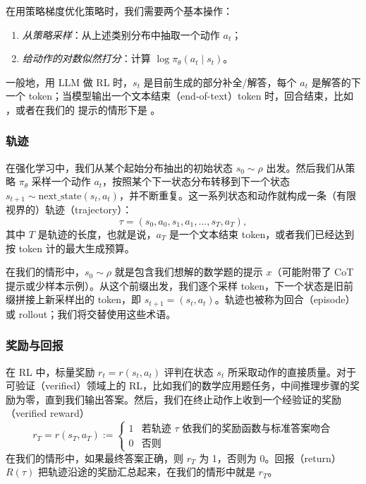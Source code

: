 在用策略梯度优化策略时，我们需要两个基本操作：

\begin{enumerate}
  \item \textit{从策略采样}：从上述类别分布中抽取一个动作 $a_t$；
  \item \textit{给动作的对数似然打分}：计算 $\log \pi_\theta(a_t \mid s_t)$。
\end{enumerate}

一般地，用 LLM 做 RL 时，$s_t$ 是目前生成的部分补全/解答，每个 $a_t$ 是解答的下一个 token；当模型输出一个文本结束（end-of-text）token 时，回合结束，比如 ，或者在我们的  提示的情形下是 。

\subsubsection{轨迹}

在强化学习中，我们从某个起始分布抽出的初始状态 $s_0 \sim \rho$ 出发。然后我们从策略 $\pi_\theta$ 采样一个动作 $a_t$，按照某个下一状态分布转移到下一个状态 $s_{t+1} \sim \text{next\_state}(s_t, a_t)$，并不断重复。这一系列状态和动作就构成一条（有限视界的）轨迹（trajectory）：
\begin{equation}
\tau = (s_0, a_0, s_1, a_1, \dots, s_T, a_T),
\end{equation}
其中 $T$ 是轨迹的长度，也就是说，$a_T$ 是一个文本结束 token，或者我们已经达到按 token 计的最大生成预算。

在我们的情形中，$s_0 \sim \rho$ 就是包含我们想解的数学题的提示 $x$（可能附带了 CoT 提示或少样本示例）。从这个前缀出发，我们逐个采样 token，下一个状态是旧前缀拼接上新采样出的 token，即 $s_{t+1} = (s_t, a_t)$。轨迹也被称为回合（episode）或 rollout；我们将交替使用这些术语。

\subsubsection{奖励与回报}

在 RL 中，标量奖励 $r_t = r(s_t, a_t)$ 评判在状态 $s_t$ 所采取动作的直接质量。对于可验证（verified）领域上的 RL，比如我们的数学应用题任务，中间推理步骤的奖励为零，直到我们输出答案。然后，我们在终止动作上收到一个经验证的奖励（verified reward）
\begin{equation}
r_T = r(s_T, a_T) :=
\begin{cases}
1 & \text{若轨迹 $\tau$ 依我们的奖励函数与标准答案吻合} \\
0 & \text{否则}
\end{cases}
\end{equation}
在我们的情形中，如果最终答案正确，则 $r_T$ 为 1，否则为 0。回报（return）$R(\tau)$ 把轨迹沿途的奖励汇总起来，在我们的情形中就是 $r_T$。

